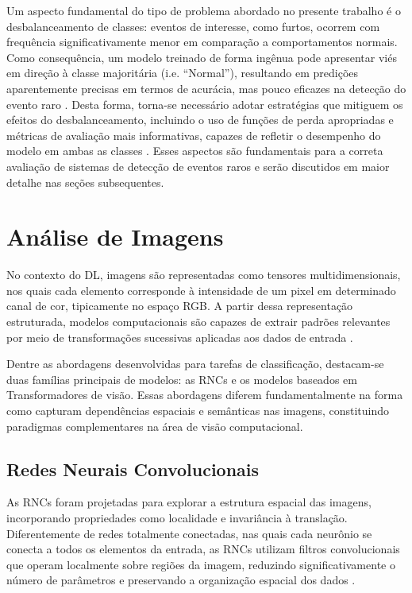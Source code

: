 \documentclass[12pt, %
openright, 
oneside, %
a4paper,    %
brazil]{facom-ufu-abntex2}
\begin{document}
Um aspecto fundamental do tipo de problema abordado no presente trabalho é o desbalanceamento de classes: eventos de interesse, como furtos, ocorrem com frequência significativamente menor em comparação a comportamentos normais. Como consequência, um modelo treinado de forma ingênua pode apresentar viés em direção à classe majoritária (i.e. “Normal”), resultando em predições aparentemente precisas em termos de acurácia, mas pouco eficazes na detecção do evento raro \cite{desbal}. Desta forma, torna-se necessário adotar estratégias que mitiguem os efeitos do desbalanceamento, incluindo o uso de funções de perda apropriadas e métricas de avaliação mais informativas, capazes de refletir o desempenho do modelo em ambas as classes \cite{metrics}. Esses aspectos são fundamentais para a correta avaliação de sistemas de detecção de eventos raros e serão discutidos em maior detalhe nas seções subsequentes.

\section[Análise de Imagens]{Análise de Imagens}

No contexto do DL, imagens são representadas como tensores multidimensionais, nos quais cada elemento corresponde à intensidade de um pixel em determinado canal de cor, tipicamente no espaço RGB. A partir dessa representação estruturada, modelos computacionais são capazes de extrair padrões relevantes por meio de transformações sucessivas aplicadas aos dados de entrada \cite{vision}.

Dentre as abordagens desenvolvidas para tarefas de classificação, destacam-se duas famílias principais de modelos: as RNCs e os modelos baseados em Transformadores de visão. Essas abordagens diferem fundamentalmente na forma como capturam dependências espaciais e semânticas nas imagens, constituindo paradigmas complementares na área de visão computacional.

\subsection[Redes Neurais Convolucionais]{Redes Neurais Convolucionais}

As RNCs foram projetadas para explorar a estrutura espacial das imagens, incorporando propriedades como localidade e invariância à translação. Diferentemente de redes totalmente conectadas, nas quais cada neurônio se conecta a todos os elementos da entrada, as RNCs utilizam filtros convolucionais que operam localmente sobre regiões da imagem, reduzindo significativamente o número de parâmetros e preservando a organização espacial dos dados \cite{vision}.
\end{document}

